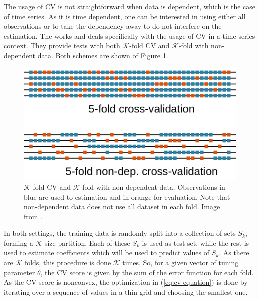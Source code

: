 The usage of CV is not straightforward when data is dependent, which is the case of time series. As it is time dependent, one can be interested in using either all observations or to take the dependency away to do not interfere on the estimation. The works
\cite{bergmeir_note_2017} and \cite{bergmeir_use_2012} deals specifically with the usage of CV in a time series context. They provide tests with both $\mathcal{K}$-fold CV and $\mathcal{K}$-fold with non-dependent data. Both schemes are shown of Figure \ref{fig:cross-validation-scheme}.
\begin{figure}
	\centering
	\includegraphics[width=0.9\linewidth]{Images/Cross-validation-scheme}
	\caption{$\mathcal{K}$-fold CV and $\mathcal{K}$-fold with non-dependent data. Observations in blue are used to estimation and in orange for evaluation. Note that non-dependent data does not use all dataset in each fold. Image from \cite{bergmeir_note_2017}.}
	\label{fig:cross-validation-scheme}
\end{figure}
In both settings, the training data is randomly split into a collection of sets $S_k$, forming a $\mathcal{K}$ size partition. Each of these $S_k$ is used as test set, while the rest is used to estimate coefficients which will be used to predict values of $S_k$. 
As there are $\mathcal{K}$ folds, this procedure is done $\mathcal{K}$ times. 
So, for a given vector of tuning parameter $\theta$, the CV score is given by the sum of the error function for each fold. 
As the CV score is nonconvex, the optimization in (\ref{eq:cv-equation}) is done by iterating over a sequence of values in a thin grid and choosing the smallest one.








